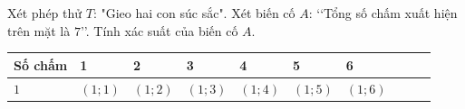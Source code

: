 \begin{bt}%
	Xét phép thử $T$: "Gieo hai con súc sắc". Xét biến cố $A$: \lq\lq Tổng số chấm xuất hiện trên mặt là $7$\rq\rq. Tính xác suất của biến cố $A$.
	\begin{center}
		\begin{tabular}{|>{\centering\arraybackslash}p{1.5cm}|>{\centering\arraybackslash}p{1.5cm}|>{\centering\arraybackslash}p{1.5cm}|>{\centering\arraybackslash}p{1.5cm}|>{\centering\arraybackslash}p{1.5cm}|>{\centering\arraybackslash}p{2cm}|>{\centering\arraybackslash}p{1.5cm}|>{\centering\arraybackslash}p{1.5cm}|>{\centering\arraybackslash}p{1.5cm}|>{\centering\arraybackslash}p{1.5cm}|}
			\hline \vspace*{0.5mm}	\textbf{Số chấm}\vspace*{0.5mm}&\vspace*{0.5mm}	\textbf{1}\vspace*{0.5mm}&\vspace*{0.5mm}\textbf{2}\vspace*{0.5mm}&\vspace*{0.5mm}\textbf{3}\vspace*{0.5mm}&\vspace*{0.5mm}\textbf{ 4}\vspace*{0.5mm}&\vspace*{0.5mm}\textbf{ 5}\vspace*{0.5mm}&\vspace*{0.5mm}\textbf{ 6}\vspace*{0.5mm}\\
			\hline 
			\vspace*{0.5mm} $1$ \vspace*{0.5mm}&\vspace*{0.5mm} $(1;1)$ \vspace*{0.5mm} & \vspace*{0.5mm} $(1;2)$ \vspace*{0.5mm} & \vspace*{0.5mm} $(1;3)$ \vspace*{0.5mm} & \vspace*{0.5mm} $(1;4)$ \vspace*{0.5mm}& \vspace*{0.5mm} $(1;5)$ \vspace*{0.5mm}& \vspace*{0.5mm} $(1;6)$ \vspace*{0.5mm}\\
			\hline 

\end{tabular}
\end{center}
\end{bt}
